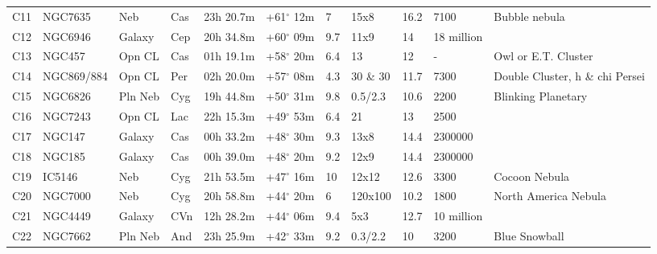 \documentclass[10pt,twoside,a4paper,english]{article}
\begin{document}
\begin{longtable}{@{}lllllllllll@{}}
C11        & NGC7635     & Neb        & Cas       & 23h 20.7m & +61$^{\circ}$ 12m  & 7         & 15x8                 & 16.2     & 7100                & Bubble nebula                   \\ 
C12        & NGC6946     & Galaxy     & Cep       & 20h 34.8m & +60$^{\circ}$ 09m  & 9.7       & 11x9                 & 14       & 18 million          &                                 \\ 
C13        & NGC457      & Opn CL     & Cas       & 01h 19.1m & +58$^{\circ}$ 20m  & 6.4       & 13                   & 12       & -                   & Owl or E.T. Cluster             \\ 
C14        & NGC869/884  & Opn CL     & Per       & 02h 20.0m & +57$^{\circ}$ 08m  & 4.3       & 30 \& 30             & 11.7     & 7300                & Double Cluster, h \& chi Persei \\ 
C15        & NGC6826     & Pln Neb    & Cyg       & 19h 44.8m & +50$^{\circ}$ 31m  & 9.8       & 0.5/2.3              & 10.6     & 2200                & Blinking Planetary              \\ 
C16        & NGC7243     & Opn CL     & Lac       & 22h 15.3m & +49$^{\circ}$ 53m  & 6.4       & 21                   & 13       & 2500                &                                 \\ 
C17        & NGC147      & Galaxy     & Cas       & 00h 33.2m & +48$^{\circ}$ 30m  & 9.3       & 13x8                 & 14.4     & 2300000             &                                 \\ 
C18        & NGC185      & Galaxy     & Cas       & 00h 39.0m & +48$^{\circ}$ 20m  & 9.2       & 12x9                 & 14.4     & 2300000             &                                 \\ 
C19        & IC5146      & Neb        & Cyg       & 21h 53.5m & +47$^{\circ}$ 16m  & 10        & 12x12                & 12.6     & 3300                & Cocoon Nebula                   \\ 
C20        & NGC7000     & Neb        & Cyg       & 20h 58.8m & +44$^{\circ}$ 20m  & 6         & 120x100              & 10.2     & 1800                & North America Nebula            \\ 
C21        & NGC4449     & Galaxy     & CVn       & 12h 28.2m & +44$^{\circ}$ 06m  & 9.4       & 5x3                  & 12.7     & 10 million          &                                 \\ 
C22        & NGC7662     & Pln Neb    & And       & 23h 25.9m & +42$^{\circ}$ 33m  & 9.2       & 0.3/2.2              & 10       & 3200                & Blue Snowball                   \\ 

\end{longtable}
\end{document}
